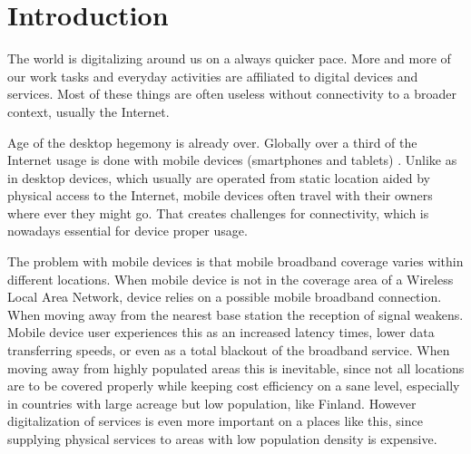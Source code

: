\chapter{Introduction}



The world is digitalizing around us on a always quicker pace. More and more of our work tasks and everyday activities are affiliated to digital devices and services. Most of these things are often useless without connectivity to a broader context, usually the Internet.


Age of the desktop hegemony is already over. Globally over a third of the Internet usage is done with mobile devices (smartphones and tablets) \cite{statcounter_global_????}. Unlike as in desktop devices, which usually are operated from static location aided by physical access to the Internet, mobile devices often travel with their owners where ever they might go. That creates challenges for connectivity, which is nowadays essential for device proper usage.

The problem with mobile devices is that mobile broadband coverage varies within different locations. When mobile device is not in the coverage area of a Wireless Local Area Network, device relies on a possible mobile broadband connection. When moving away from the nearest base station the reception of signal weakens. Mobile device user experiences this as an increased latency times, lower data transferring speeds, or even as a total blackout of the broadband service. When moving away from highly populated areas this is inevitable, since not all locations are to be covered properly while keeping cost efficiency on a sane level, especially in countries with large acreage but low population, like Finland. However digitalization of services is even more important on a places like this, since supplying physical services to areas with low population density is expensive. 

